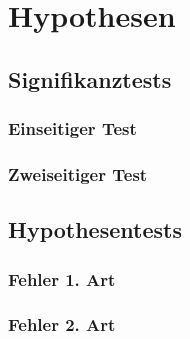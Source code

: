 \documentclass[../MAIN/main.tex]{subfiles}
\begin{document}
\section{Hypothesen}
\subsection{Signifikanztests}
\subsubsection{Einseitiger Test}
\subsubsection{Zweiseitiger Test}
\subsection{Hypothesentests}
\subsubsection{Fehler 1. Art}
\subsubsection{Fehler 2. Art}
\end{document}
